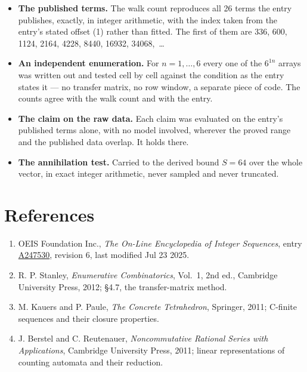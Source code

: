 \documentclass[11pt]{article}
\theoremstyle{definition}
\begin{document}
\begin{itemize}

\item {\bfseries The published terms.} The walk count reproduces all 26 terms the entry publishes, exactly, in integer arithmetic, with the index taken from the entry's stated offset (1) rather than fitted. The first of them are 336, 600, 1124, 2164, 4228, 8440, 16932, 34068,~\dots

\item {\bfseries An independent enumeration.} For $n = 1,\dots,6$ every one of the $6^{1n}$ arrays was written out and tested cell by cell against the condition as the entry states it --- no transfer matrix, no row window, a separate piece of code. The counts agree with the walk count and with the entry.

\item {\bfseries The claim on the raw data.} Each claim was evaluated on the entry's published terms alone, with no model involved, wherever the proved range and the published data overlap. It holds there.

\item {\bfseries The annihilation test.} Carried to the derived bound $S = 64$ over the whole vector, in exact integer arithmetic, never sampled and never truncated.

\end{itemize}

\section{References}

\begin{enumerate}

\item OEIS Foundation Inc., \emph{The On-Line Encyclopedia of Integer Sequences}, entry \href{https://oeis.org/A247530}{A247530}, revision 6, last modified Jul 23 2025.

\item R. P. Stanley, \emph{Enumerative Combinatorics}, Vol.~1, 2nd ed., Cambridge University Press, 2012; \S4.7, the transfer-matrix method.

\item M. Kauers and P. Paule, \emph{The Concrete Tetrahedron}, Springer, 2011; C-finite sequences and their closure properties.

\item J. Berstel and C. Reutenauer, \emph{Noncommutative Rational Series with Applications}, Cambridge University Press, 2011; linear representations of counting automata and their reduction.

\end{enumerate}
\end{document}
